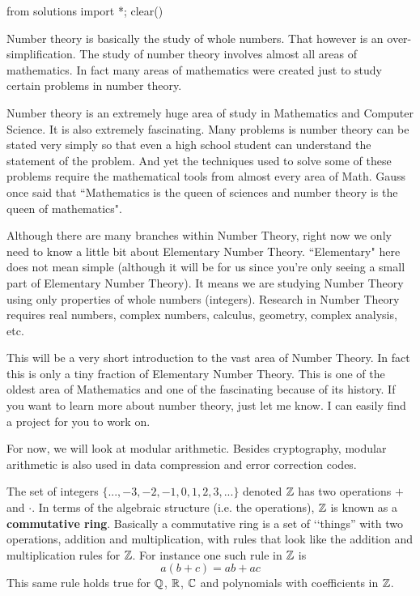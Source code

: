 \begin{python0}
from solutions import *; clear()
\end{python0}

Number theory is basically the study of whole numbers.
That however is an over-simplification.
The study of number theory involves almost all areas of mathematics.
In fact many areas of mathematics were created just to study 
certain problems in number theory.

Number theory is an extremely huge area of study in Mathematics and Computer
Science. It is also extremely fascinating. Many problems is number theory can
be stated very simply so that even a high school student can understand the
statement of the problem. And yet the techniques used to solve some of these
problems require the mathematical tools from almost every area of Math. Gauss
once said that ``Mathematics is the queen of sciences and number theory is the
queen of mathematics".

Although there are many branches within Number Theory, right now
we only need to know a little bit about Elementary Number Theory.
``Elementary" here does not mean simple (although it will be for
us since you're only seeing a small part of Elementary Number
Theory). It means we are studying Number Theory using only
properties of whole numbers (integers). Research in Number Theory
requires real numbers, complex numbers, calculus, geometry,
complex analysis, etc.

This will be a very short introduction to the vast area of Number
Theory. In fact this is only a tiny fraction of Elementary Number
Theory. This is one of the oldest area of Mathematics and one of
the fascinating because of its history. If you want to learn more
about number theory, just let me know. I can easily find a project
for you to work on.

For now, we will look at modular arithmetic.
Besides cryptography,
modular arithmetic is also used in
data compression and error correction codes.

The set of integers $\{..., -3, -2, -1, 0, 1, 2, 3, ...\}$
denoted $\mathbb Z$ has two operations $+$ and $\cdot$.
In terms of the algebraic structure (i.e. the operations), $\mathbb Z$ is known as
a \textbf{commutative ring}.
Basically a commutative ring is a set of \lq\lq things'' with
two operations, addition and multiplication, with rules that
look like the addition and multiplication rules for $\mathbb Z$.
For instance one such rule in $\mathbb Z$ is
\[
  a (b + c) = ab + ac
\]
This same rule holds true for $\mathbb Q$, $\mathbb R$, $\mathbb C$ and polynomials with coefficients in $\mathbb Z$.

